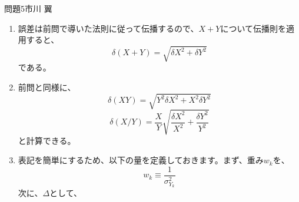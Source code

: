 \documentclass[fleqn]{jbook}
\begin{document}
\begin{answer}{問題5}{市川 翼}
\begin{enumerate}
\begin{equation}
		\end{equation}
なので、はじめの等式を両辺を２乗して和をとると、
		\begin{equation}
		 \sigma_{f}^{2} = \left(\frac{\partial f}{\partial X}\right)^2
\sigma_{x}^{2} + \left(\frac{\partial f}{\partial Y}\right)^2\sigma_{y}^{2}
+ 2\frac{\partial f}{\partial X}\frac{\partial f}{\partial Y}\frac{1}{N}\sum _{i=1} ^N (x_i - X)(y_i - Y)
		\end{equation}
が得られる。この式の右辺第３項は$x$と$y$が独立変数なので、多数回の測定では消える。よって、誤差の伝播は以下の式に従う。
		\begin{equation}
		 \sigma_{f}^{2} = \left(\frac{\partial f}{\partial X}\right)^2
\sigma_{x}^{2} + \left(\frac{\partial f}{\partial Y}\right)^2\sigma_{y}^{2}
		\end{equation}  
これを独立な$n$変数に拡張して、問題2でもとめた$X$を$x_1,x_2,....x_n$の関数とみなして適用する。$x_i$は同一の物理量の測定値なので、標準偏差はすべて等しく前問で求めた$\sigma$である。また、$\partial X/\partial x_i = 1 / N$がすべての$i$について成り立つから、最尤値$X$の標準偏差、つまり誤差$\delta X$は、
		\begin{equation}
		 \delta X = \sqrt{N\frac{1}{N^2}\sigma^2}
		          = \frac{\sigma}{\sqrt{N}} 
		\end{equation}
となる。$N$を大きくした場合、$\sigma$はほとんど変化しない（ずうっと同じ条件のもとで測定をしているので、誤差も同じような出現の仕方をするはずです。）ので、$\delta X$はゆるやかに減少していくことになる。
	\item 誤差は前問で導いた法則に従って伝播するので、$X + Y$について伝播則を適用すると、
		\begin{equation}
		 \delta (X + Y) = \sqrt{\delta X^2 + \delta Y^2}
		\end{equation}
である。
	\item 前問と同様に、
		\begin{equation}
		 \delta (XY) = \sqrt{Y^2\delta X^2 + X^2\delta Y^2}
		\end{equation}
		\begin{equation}
		 \delta (X/Y) = \frac{X}{Y}\sqrt{\frac{\delta X^2}{X^2} + 
				\frac{\delta Y^2}{Y^2}}
		\end{equation}
と計算できる。
	\item 表記を簡単にするため、以下の量を定義しておきます。まず、重み$w_k$を、
		\begin{equation}
		 w_k \equiv \frac{1}{\sigma_{Y_k}^{2}}
		\end{equation}
次に、$\Delta$として、
		\begin{equation}

\end{equation}
\end{enumerate}
\end{answer}
\end{document}

